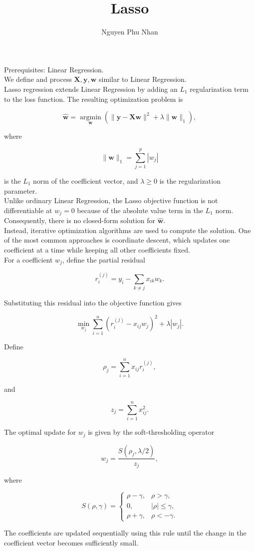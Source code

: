 \documentclass[14pt]{extarticle}
\title{Lasso}
\author{Nguyen Phu Nhan}
\date{}
\begin{document}
\maketitle
Prerequisites: Linear Regression. \\

We define and process $\mathbf{X}, \mathbf{y}, \mathbf{w}$ similar to Linear Regression. \\

Lasso regression extends Linear Regression by adding an $L_1$ regularization term to the loss function. The resulting optimization problem is

\[
\hat{\mathbf{w}} =
\operatorname*{argmin}_{\mathbf{w}}\left(\|\mathbf{y}-\mathbf{X}\mathbf{w}\|^2 + \lambda \|\mathbf{w}\|_1\right),
\]

where

\[
\|\mathbf{w}\|_1 = \sum_{j=1}^{p}|w_j|
\]

is the $L_1$ norm of the coefficient vector, and $\lambda \ge 0$ is the regularization parameter. \\

Unlike ordinary Linear Regression, the Lasso objective function is not
differentiable at $w_j = 0$ because of the absolute value term in the
$L_1$ norm. Consequently, there is no closed-form solution for
$\hat{\mathbf{w}}$. \\

Instead, iterative optimization algorithms are used to compute the
solution. One of the most common approaches is coordinate descent,
which updates one coefficient at a time while keeping all other
coefficients fixed. \\

For a coefficient $w_j$, define the partial residual

\[
r_i^{(j)} = y_i - \sum_{k \ne j} x_{ik} w_k.
\]

Substituting this residual into the objective function gives

\[
\min_{w_j}\sum_{i=1}^{n}\left(r_i^{(j)} - x_{ij} w_j\right)^2
+ \lambda |w_j|.
\]

Define

\[
\rho_j = \sum_{i=1}^{n} x_{ij} r_i^{(j)},
\]

and

\[
z_j = \sum_{i=1}^{n} x_{ij}^{2}.
\]

The optimal update for $w_j$ is given by the soft-thresholding operator

\[
w_j = \frac{S(\rho_j,\lambda/2)}{z_j},
\]

where

\[
S(\rho,\gamma)
=
\begin{cases}
\rho-\gamma, & \rho > \gamma, \\
0, & |\rho| \le \gamma, \\
\rho+\gamma, & \rho < -\gamma.
\end{cases}
\]

The coefficients are updated sequentially using this rule until the
change in the coefficient vector becomes sufficiently small.
\end{document}
